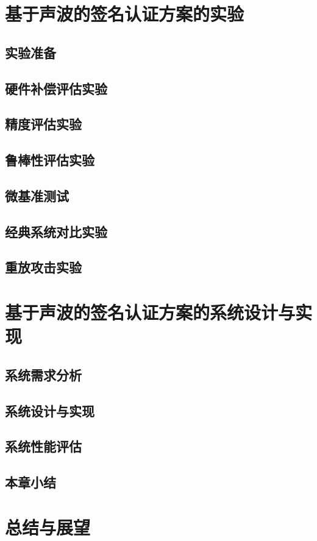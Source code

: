 \chapter{基于声波的签名认证方案的实验}
\section{实验准备}
\section{硬件补偿评估实验}
\section{精度评估实验}
\section{鲁棒性评估实验}
\section{微基准测试}
\section{经典系统对比实验}
\section{重放攻击实验}

\chapter{基于声波的签名认证方案的系统设计与实现}
\section{系统需求分析}
\section{系统设计与实现}
\section{系统性能评估}
\section{本章小结}

\chapter{总结与展望}
